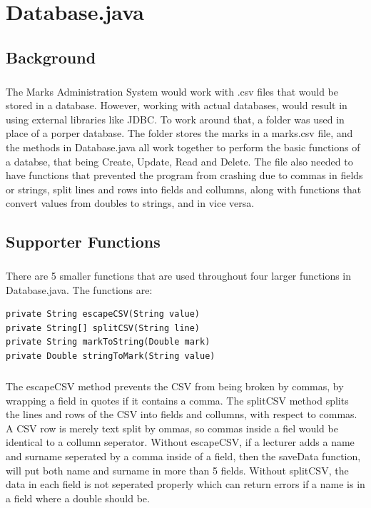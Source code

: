 \chapter{Database.java}
\section{Background}

\paragraph{}
The Marks Administration System would work with .csv files that would be stored in a database.
However, working with actual databases, would result in using external libraries
like JDBC. To work around that, a folder was used in place of a porper database.
The folder stores the marks in a marks.csv file, and the methods in Database.java 
all work together to perform the basic functions of a databse, that being Create, Update, Read and Delete.
The file also needed to have functions that prevented the program from crashing due to commas in fields or strings, 
split lines and rows into fields and collumns, along with functions that convert values from doubles to strings, and in vice versa.

\section{Supporter Functions}

\paragraph{}
There are 5 smaller functions that are used throughout four larger functions in Database.java.
The functions are:
\begin{verbatim}
private String escapeCSV(String value)
private String[] splitCSV(String line)
private String markToString(Double mark)
private Double stringToMark(String value)
\end{verbatim}

\paragraph{}
The escapeCSV method prevents the CSV from being broken by commas, by wrapping a field in 
quotes if it contains a comma. The splitCSV method splits the lines and rows of the CSV
into fields and collumns, with respect to commas. A CSV row is merely text split by ommas, so 
commas inside a fiel would be identical to a collumn seperator. Without escapeCSV, if a lecturer adds a name and surname seperated by a comma inside of a field,
then the saveData function, will put both name and surname in more than 5 fields. 
Without splitCSV, the data in each field is not seperated properly which can return errors if a name 
is in a field where a double should be.

